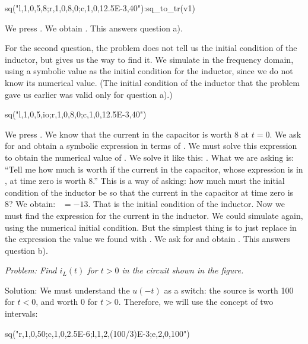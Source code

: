 \begin{entry}
sq\fd("l,1,0,5,8;r,1,0,8,0;c,1,0,12.5E-3,40"):sq\fd_to_tr(v1)
\end{entry}

We press . We obtain
. This answers question a).

For the second question, the problem does not tell us the initial
condition of the inductor, but gives us the way to find it. We
simulate in the frequency domain, using a symbolic value 
as the initial condition for the inductor, since we do not know its
numerical value. (The initial condition of the inductor that the
problem gave us earlier was valid only for question a).)

\begin{entry}
sq\fd("l,1,0,5,io;r,1,0,8,0;c,1,0,12.5E-3,40")
\end{entry}

We press . We know that the current in the capacitor is
worth 8 at $t = 0$. We ask for  and
obtain a symbolic expression in terms of . We must solve
this expression to obtain the numerical value of . We solve
it like this: . What we are asking is:
``Tell me how much  is worth if the current in the
capacitor, whose expression is in , at time zero is
worth 8.'' This is a way of asking: how much must the initial
condition of the inductor be so that the current in the capacitor at
time zero is 8? We obtain: ~$= -13.$ That is the initial
condition of the inductor. Now we must find the expression for the
current in the inductor. We could simulate again, using the
numerical initial condition. But the simplest thing is to just
replace in the expression the value we found with . We
ask for  and obtain
. This answers question b).


\emph{Problem: Find $i_L(t)$ for $t > 0$ in the circuit shown in the
figure.}

Solution: We must understand the $u(-t)$ as a switch: the source is
worth 100 for $t < 0$, and worth 0 for $t > 0$. Therefore, we will
use the concept of two intervals:

\begin{entry}
sq\dc("r,1,0,50;c,1,0,2.5E-6;l,1,2,(100/3)E-3;e,2,0,100")
\end{entry}

